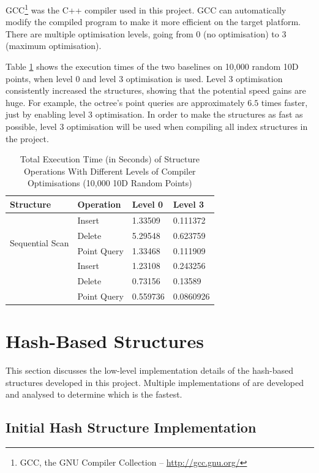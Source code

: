 GCC\footnote{GCC, the GNU Compiler Collection -- \url{http://gcc.gnu.org/}} was the C++ compiler used in this project. GCC can automatically modify the compiled program to make it more efficient on the target platform. There are multiple optimisation levels, going from 0 (no optimisation) to 3 (maximum optimisation).

Table \ref{tab:compiler-optimisation} shows the execution times of the two baselines on 10,000 random 10D points, when level 0 and level 3 optimisation is used. Level 3 optimisation consistently increased the structures, showing that the potential speed gains are huge. For example, the octree's point queries are approximately $6.5$ times faster, just by enabling level 3 optimisation.  In order to make the structures as fast as possible, level 3 optimisation will be used when compiling all index structures in the project.

\begin{table}
	\centering
	\begin{tabular}{|l|l|l|l|}
		\hline
		\textbf{Structure} & \textbf{Operation} & \textbf{Level 0} & \textbf{Level 3} \\
		\hline
		\multirow{ 4}{*}{Sequential Scan} & Insert & 1.33509 & 0.111372 \\
		 & Delete & 5.29548 & 0.623759 \\
		 & Point Query & 1.33468 & 0.111909 \\
		\hline
		\multirow{ 4}{*}{Octree} & Insert & 1.23108 & 0.243256 \\
		 & Delete & 0.73156 & 0.13589 \\
		 & Point Query & 0.559736 & 0.0860926 \\
		 \hline
	\end{tabular}
	\caption{Total Execution Time (in Seconds) of Structure Operations With Different Levels of Compiler Optimisations (10,000 10D Random Points)}
	\label{tab:compiler-optimisation}
\end{table}

\section{Hash-Based Structures}
\label{sec:iteration1}

This section discusses the low-level implementation details of the hash-based structures developed in this project. Multiple implementations of are developed and analysed to determine which is the fastest.

\subsection{Initial Hash Structure Implementation}

